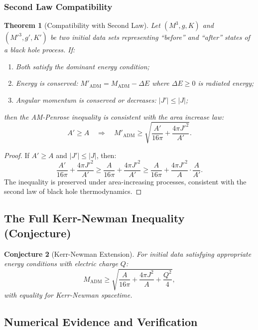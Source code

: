 \documentclass[12pt]{article}
\theoremstyle{plain}
\newtheorem{theorem}{Theorem}[section]
\newtheorem{conjecture}[theorem]{Conjecture}
\theoremstyle{definition}
\theoremstyle{remark}
\newcommand{\ADM}{\mathrm{ADM}}
\begin{document}
\subsubsection{Second Law Compatibility}

\begin{theorem}[Compatibility with Second Law]\label{thm:second-law}
Let $(M^3, g, K)$ and $(M'^3, g', K')$ be two initial data sets representing ``before'' and ``after'' states of a black hole process. If:
\begin{enumerate}[label=(\roman*)]
    \item Both satisfy the dominant energy condition;
    \item Energy is conserved: $M'_{\ADM} = M_{\ADM} - \Delta E$ where $\Delta E \geq 0$ is radiated energy;
    \item Angular momentum is conserved or decreases: $|J'| \leq |J|$;
\end{enumerate}
then the AM-Penrose inequality is consistent with the area increase law:
\begin{equation}
    A' \geq A \quad \Longrightarrow \quad M'_{\ADM} \geq \sqrt{\frac{A'}{16\pi} + \frac{4\pi J'^2}{A'}}.
\end{equation}
\end{theorem}

\begin{proof}
If $A' \geq A$ and $|J'| \leq |J|$, then:
\[
\frac{A'}{16\pi} + \frac{4\pi J'^2}{A'} \geq \frac{A}{16\pi} + \frac{4\pi J'^2}{A'} \geq \frac{A}{16\pi} + \frac{4\pi J'^2}{A} \cdot \frac{A}{A'}.
\]
The inequality is preserved under area-increasing processes, consistent with the second law of black hole thermodynamics.
\end{proof}

\subsection{The Full Kerr-Newman Inequality (Conjecture)}

\begin{conjecture}[Kerr-Newman Extension]\label{conj:kerr-newman}
For initial data satisfying appropriate energy conditions with electric charge $Q$:
\begin{equation}
M_{\ADM} \geq \sqrt{\frac{A}{16\pi} + \frac{4\pi J^2}{A} + \frac{Q^2}{4}},
\end{equation}
with equality for Kerr-Newman spacetime.
\end{conjecture}

\subsection{Numerical Evidence and Verification}\label{subsec:numerical}
\end{document}
